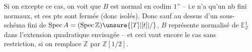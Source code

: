 Si on excepte ce cas, on voit que $B$ est normal en codim $1$'' -- i.e  n'a qu'un nb fini  normaux, et ces pts sont fermés (donc isolés). Donc  sauf  au dessus d'un sous-schéma fini de $\mathrm{Spec}\,A=(\mathrm{Spec}\,\mathbb Z)\unsure{[T]|[t]|/}$, $B$ représente  normalisé de $\mathbb E^1_{\mathbb Z}$ dans l'extension quadratique envisagée -- et ceci vaut encore le cas sans restriction, si on remplace $\mathbb Z$ par $\mathbb Z[1/2]$.
